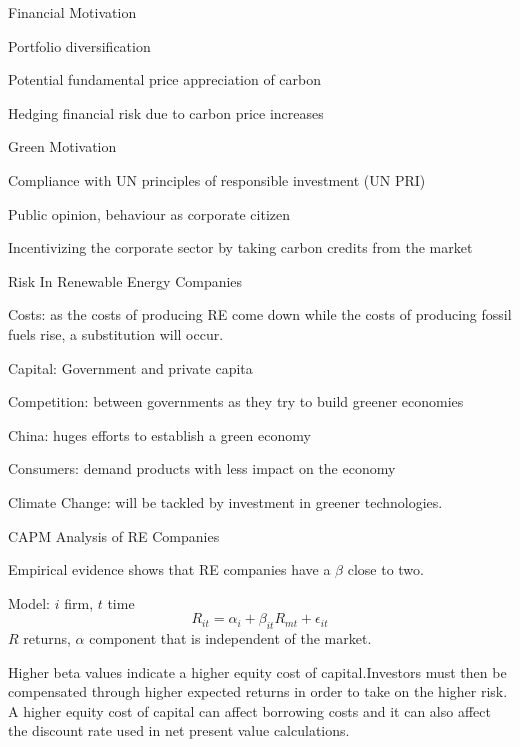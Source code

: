 \item<1-> Financial Motivation




\item Portfolio diversification
\item Potential fundamental price appreciation of carbon
\item Hedging financial risk due to carbon price increases




\item<2-> Green Motivation




\item Compliance with UN principles of responsible investment (UN PRI)
\item Public opinion, behaviour as corporate citizen
\item Incentivizing the corporate sector by taking carbon credits from the market









{Risk In Renewable Energy Companies}




\item<1-> Costs: as the costs of producing RE come down while the costs of producing fossil fuels rise, a
substitution will occur.
\item<2-> Capital: Government and private capita
\item<3-> Competition: between governments as they try to build greener economies
\item<4-> China: huges efforts to establish a green economy
\item<5-> Consumers: demand products with less impact on the economy
\item<6-> Climate Change: will be tackled by investment in greener technologies.





{CAPM Analysis of RE Companies}




\item<1-> Empirical evidence shows that RE companies have a $\beta$ close to two.
\item<2-> Model: $i$ firm, $t$ time
$$
R_{it}= \alpha_i + \beta_{it} R_{mt}+\epsilon_{it}
$$
$R$ returns, $\alpha$ component that is independent of the market.
\item<3-> Higher beta values indicate a higher equity cost of capital.Investors must then be compensated
through higher expected returns in order to take on the higher risk. A higher equity cost of capital can affect borrowing costs and
it can also affect the discount rate used in net present value calculations.


